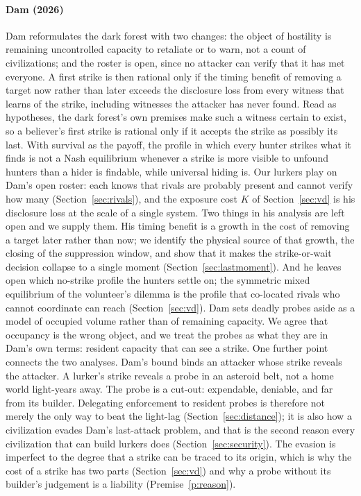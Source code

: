 \documentclass[preprint,12pt]{elsarticle}
\theoremstyle{definition}
\begin{document}
\paragraph{Dam (2026)}
Dam \citep{Dam2026} reformulates the dark forest with two changes: the object of hostility is remaining uncontrolled capacity to retaliate or to warn, not a count of civilizations; and the roster is open, since no attacker can verify that it has met everyone. A first strike is then rational only if the timing benefit of removing a target now rather than later exceeds the disclosure loss from every witness that learns of the strike, including witnesses the attacker has never found. Read as hypotheses, the dark forest's own premises make such a witness certain to exist, so a believer's first strike is rational only if it accepts the strike as possibly its last. With survival as the payoff, the profile in which every hunter strikes what it finds is not a Nash equilibrium whenever a strike is more visible to unfound hunters than a hider is findable, while universal hiding is. Our lurkers play on Dam's open roster: each knows that rivals are probably present and cannot verify how many (Section~\ref{sec:rivals}), and the exposure cost $K$ of Section~\ref{sec:vd} is his disclosure loss at the scale of a single system. Two things in his analysis are left open and we supply them. His timing benefit is a growth in the cost of removing a target later rather than now; we identify the physical source of that growth, the closing of the suppression window, and show that it makes the strike-or-wait decision collapse to a single moment (Section~\ref{sec:lastmoment}). And he leaves open which no-strike profile the hunters settle on; the symmetric mixed equilibrium of the volunteer's dilemma is the profile that co-located rivals who cannot coordinate can reach (Section~\ref{sec:vd}). Dam sets deadly probes aside as a model of occupied volume rather than of remaining capacity. We agree that occupancy is the wrong object, and we treat the probes as what they are in Dam's own terms: resident capacity that can see a strike. One further point connects the two analyses. Dam's bound binds an attacker whose strike reveals the attacker. A lurker's strike reveals a probe in an asteroid belt, not a home world light-years away. The probe is a cut-out: expendable, deniable, and far from its builder. Delegating enforcement to resident probes is therefore not merely the only way to beat the light-lag (Section~\ref{sec:distance}); it is also how a civilization evades Dam's last-attack problem, and that is the second reason every civilization that can build lurkers does (Section~\ref{sec:security}). The evasion is imperfect to the degree that a strike can be traced to its origin, which is why the cost of a strike has two parts (Section~\ref{sec:vd}) and why a probe without its builder's judgement is a liability (Premise~\ref{p:reason}).
\end{document}
